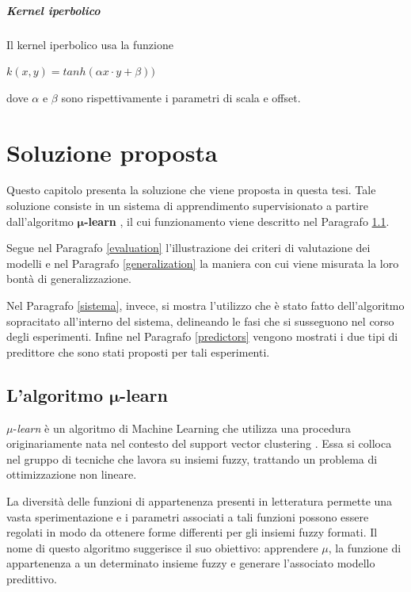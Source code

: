 \documentclass[12pt]{report}
\theoremstyle{definition}
\begin{document}
\paragraph{Kernel iperbolico}
Il kernel iperbolico usa la funzione
\begin{center}
    $k(x,y) = tanh(\alpha x \cdot y + \beta))$
\end{center}
dove $\alpha$ e $\beta$ sono rispettivamente i parametri di scala e offset.

\chapter{Soluzione proposta}
\label{Capitolo 2}
\onehalfspacing
Questo capitolo presenta la soluzione che viene proposta in questa tesi.
Tale soluzione consiste in un sistema di apprendimento supervisionato a partire dall'algoritmo $\bm{\mu}$\textbf{-learn} \cite{1}, il cui funzionamento viene descritto nel Paragrafo \ref{mulearn}.

Segue nel Paragrafo \ref{evaluation} l'illustrazione dei criteri di valutazione dei modelli e nel Paragrafo \ref{generalization} la maniera con cui viene misurata la loro bontà di generalizzazione.

Nel Paragrafo \ref{sistema}, invece, si mostra l'utilizzo che è stato fatto dell'algoritmo sopracitato all'interno del sistema, delineando le fasi che si susseguono nel corso degli esperimenti. Infine nel Paragrafo \ref{predictors} vengono mostrati i due tipi di predittore che sono stati proposti per tali esperimenti.

\section[\texorpdfstring{L'algoritmo $\mu$-learn}%
                        {mu-learn}]%
        {L'algoritmo $\bm{\mu}$-learn}  %
\label{mulearn}
$\mu$-\textit{learn} è un algoritmo di Machine Learning che utilizza una procedura originariamente nata nel contesto del support vector clustering \cite{23}.
Essa si colloca nel gruppo di tecniche che lavora su insiemi fuzzy, trattando un problema di ottimizzazione non lineare.

La diversità delle funzioni di appartenenza presenti in letteratura permette una vasta sperimentazione e i parametri associati a tali funzioni possono essere regolati in modo da ottenere forme differenti per gli insiemi fuzzy formati.
Il nome di questo algoritmo suggerisce il suo obiettivo: apprendere $\mu$, la funzione di appartenenza a un determinato insieme fuzzy e generare l'associato modello predittivo.
\end{document}
